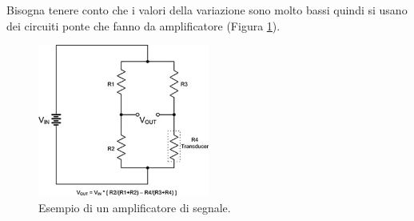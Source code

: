 \documentclass[11pt, twocolumn]{article}
\begin{document}
Bisogna tenere conto che i valori della variazione sono molto bassi quindi si usano dei circuiti ponte che fanno da amplificatore (Figura \ref{fig:amplifier}).
\begin{figure}[!h]
  \centering
  \includegraphics[width=\linewidth,height=5cm]{imgs/amplifier.jpg}
  \caption{Esempio di un amplificatore di segnale.}
  \label{fig:amplifier}
\end{figure}
\end{document}
